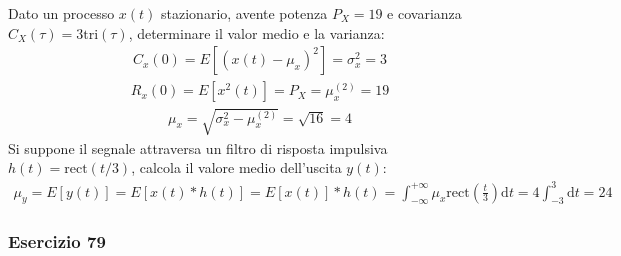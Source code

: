 \documentclass{article}
\newcommand{\rect}{\mathrm{rect}}
\newcommand{\tri}{\mathrm{tri}}
\newcommand{\df}{\mathrm{d}}
\begin{document}
Dato un processo $x(t)$ stazionario, avente potenza $P_X=19$ e covarianza $C_X(\tau)=3\tri(\tau)$, determinare il valor medio e la varianza: 
\begin{gather}
    C_x(0)=E[(x(t)-\mu_x)^2]=\sigma_x^2=3
\end{gather}
\begin{gather*}
    R_x(0)=E[x^2(t)]=P_X=\mu_x^{(2)}=19
\end{gather*}
\begin{gather}
    \mu_x=\sqrt{\sigma_x^2-\mu_x^{(2)}}=\sqrt{16}=4
\end{gather}
Si suppone il segnale attraversa un filtro di risposta impulsiva $h(t)=\rect(t/3)$, calcola il valore medio dell'uscita $y(t)$:
\begin{gather}
    \mu_y=E[y(t)]=E[x(t)*h(t)]=E[x(t)]*h(t)=\displaystyle\int_{-\infty}^{+\infty}\mu_x\rect\left(\frac{t}{3}\right)\df t=4\int_{-3}^3\df t=24
\end{gather}

\subsubsection*{Esercizio 79}
\end{document}
